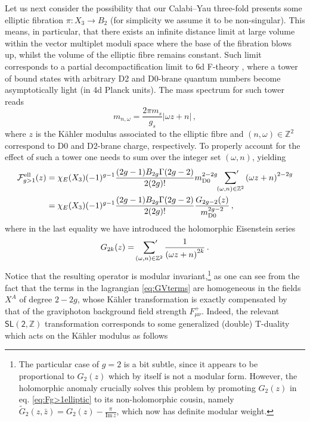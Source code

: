 Let us next consider the possibility that our Calabi--Yau three-fold presents some elliptic fibration $\pi: X_3 \to B_2$ (for simplicity we assume it to be non-singular). This means, in particular, that there exists an infinite distance limit at large volume within the vector multiplet moduli space where the base of the fibration blows up, whilst the volume of the elliptic fibre remains constant. Such limit corresponds to a partial decompactification limit to 6d F-theory \cite{Lee:2019wij}, where a tower of bound states with arbitrary D2 and D0-brane quantum numbers become asymptotically light (in 4d Planck units). The mass spectrum for such tower reads
%
\begin{equation}
\label{eq:ellipticmass}
	m_{n,\omega} = \frac{2\pi m_s}{g_s} \left| \omega z+n\right|\, ,
\end{equation}
%
where $z$ is the K\"ahler modulus associated to the elliptic fibre and $(n,\omega) \in \mathbb{Z}^2$ correspond to D0 and D2-brane charge, respectively. To properly account for the effect of such a tower one needs to sum over the integer set $(\omega, n)$, yielding
%
\begin{align}
\label{eq:Fg>1elliptic}
	\mathcal{F}^{\rm ell}_{g>1} (z)&= \chi_E(X_3)(-1)^{g-1} \frac{(2g-1)B_{2g} \Gamma(2g-2)}{2(2g)!} m_{\rm D0}^{2-2g} \sideset{}{'}\sum_{(\omega,n) \in \mathbb{Z}^2} \left(\omega z+n \right)^{2-2g}\notag\\
    &=\chi_E(X_3)(-1)^{g-1} \frac{(2g-1)B_{2g} \Gamma(2g-2)}{2(2g)!} \frac{G_{2g-2}(z)}{m_{\rm D0}^{2g-2}}\, ,
\end{align}
%
where in the last equality we have introduced the holomorphic Eisenstein series 
%
\begin{align}
\label{eq:holoEisenstein}
	G_{2k}(z) = \sideset{}{'}\sum_{(\omega, n) \in \mathbb{Z}^2} \frac{1}{\left(\omega z +n \right)^{2k}}\, .
\end{align}
%
Notice that the resulting operator is modular invariant,\footnote{The particular case of $g=2$ is a bit subtle, since it appears to be proportional to $G_2(z)$ which by itself is not a modular form. However, the holomorphic anomaly \cite{Bershadsky:1993cx} crucially solves this problem by promoting $G_2(z)$ in eq. \eqref{eq:Fg>1elliptic} to its non-holomorphic cousin, namely $\tilde{G}_2 (z, \bar z)= G_2(z)- \frac{\pi}{\text{Im}\, z}$, which now has definite modular weight.} as one can see from the fact that the terms in the lagrangian \eqref{eq:GVterms} are homogeneous in the fields $X^A$ of degree $2-2g$, whose K\"ahler transformation is exactly compensated by that of the graviphoton background field strength $F^+_{\mu \nu}$. Indeed, the relevant $\mathsf{SL(2,\mathbb{Z})}$ transformation corresponds to some generalized (double) T-duality which acts on the K\"ahler modulus as follows
